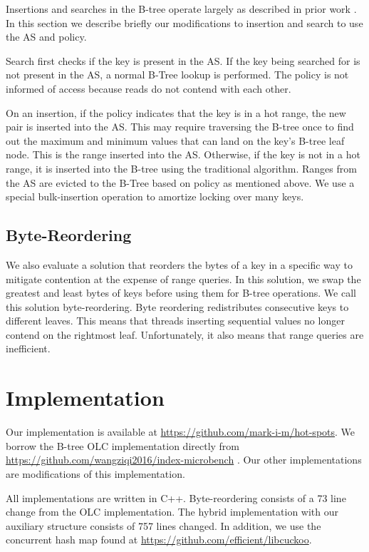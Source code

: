 \documentclass[twocolumn]{article}
\begin{document}
Insertions and searches in the B-tree operate largely as described in prior
work \cite{art, critique}. In this section we describe briefly our
modifications to insertion and search to use the AS and policy.

Search first checks if the key is present in the AS. If the key being searched
for is not present in the AS, a normal B-Tree lookup is performed. The policy
is not informed of access because reads do not contend with each other.

On an insertion, if the policy indicates that the key is in a hot range, the
new pair is inserted into the AS. This may require traversing the B-tree once
to find out the maximum and minimum values that can land on the key’s B-tree
leaf node. This is the range inserted into the AS. Otherwise, if the key is not
in a hot range, it is inserted into the B-tree using the traditional algorithm.
Ranges from the AS are evicted to the B-Tree based on policy as mentioned
above. We use a special bulk-insertion operation to amortize locking over many
keys.

\subsection{Byte-Reordering}

We also evaluate a solution that reorders the bytes of a key in a specific way
to mitigate contention at the expense of range queries. In this solution, we
swap the greatest and least bytes of keys before using them for B-tree
operations. We call this solution byte-reordering. Byte reordering
redistributes consecutive keys to different leaves. This means that threads
inserting sequential values no longer contend on the rightmost leaf.
Unfortunately, it also means that range queries are inefficient.

\section{Implementation}

Our implementation is available at \url{https://github.com/mark-i-m/hot-spots}.
We borrow the B-tree OLC implementation directly from
\url{https://github.com/wangziqi2016/index-microbench} \cite{art}. Our other
implementations are modifications of this implementation.

All implementations are written in C++. Byte-reordering consists of a 73 line
change from the OLC implementation. The hybrid implementation with our
auxiliary structure consists of 757 lines changed. In addition, we use the
concurrent hash map found at \url{https://github.com/efficient/libcuckoo}.
\end{document}
